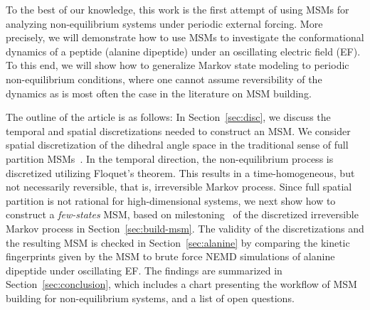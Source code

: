 \documentclass[journal=jctcce,manuscript=article]{achemso}
\begin{document}
To the best of our knowledge, this work is the first attempt of using MSMs for analyzing non-equilibrium systems under periodic external forcing.
More precisely, we will demonstrate how to use MSMs to investigate the conformational dynamics of a peptide (alanine dipeptide) under an oscillating electric field (EF).
To this end, we will show how to generalize Markov state modeling to periodic non-equilibrium conditions, where one cannot assume reversibility of the dynamics as is most often the case in the literature on MSM building.

The outline of the article is as follows: 
In Section~\ref{sec:disc}, we discuss the temporal and spatial
discretizations needed to construct an MSM. We consider spatial discretization
of the dihedral angle space in the traditional sense of full partition MSMs~\cite{pande2010everything,A19-29}.
In the temporal direction, the non-equilibrium process
is discretized utilizing Floquet's theorem. This results in a time-homogeneous, 
but not necessarily reversible, that is, irreversible Markov process. Since  full spatial partition is not rational
for high-dimensional systems, we next show how to construct a \emph{few-states} MSM, based on milestoning~\cite{schuette2011markov,A19-29} of the discretized irreversible Markov process in Section~\ref{sec:build-msm}.
The validity of the discretizations and the resulting MSM is checked in Section~\ref{sec:alanine}
by comparing the kinetic fingerprints given by the MSM to brute force
NEMD simulations of alanine dipeptide under oscillating EF.
The findings are summarized in Section~\ref{sec:conclusion}, which includes a chart presenting
the workflow of MSM building for non-equilibrium systems, and a list of open questions.



\end{document}
